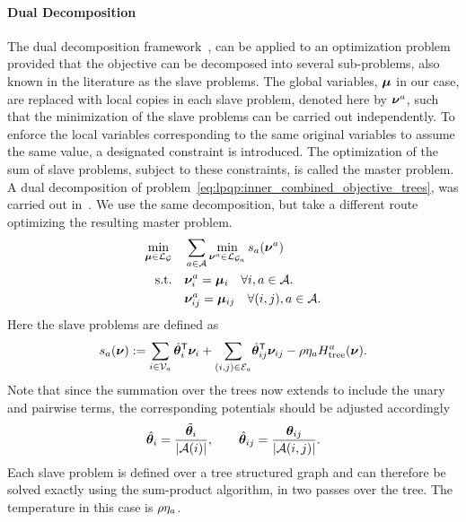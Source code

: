 \paragraph{Dual Decomposition}
The dual decomposition framework~\parencite{Bertsekas1999, Komodakis2007}, 
can be applied to an optimization problem provided that the objective 
can be decomposed into several sub-problems, also known in the literature 
as the slave problems. The global variables, $\bm{\mu}$ in our case, 
are replaced with local copies in each slave problem, denoted here by
$\bm{\nu}^a$, 
such that the minimization of the slave problems can be carried out 
independently. To enforce the local variables corresponding to the same 
original variables to assume the same value, a designated constraint is 
introduced. The optimization of the sum of slave problems, subject to 
these constraints, is called the master problem. 
A dual decomposition of problem~\eqref{eq:lpqp:inner_combined_objective_trees}, 
was carried out in~\parencite{Domke2011}. 
We use the same decomposition, but take a different route optimizing 
the resulting master problem. 
\begin{align}
    \label{eq:lpqp:inner_combined_objective_trees_dd}
    \min_{\bm{\mu}\in\mathcal{L}_{\mathcal{G}}} \quad &
    \sum_{a \in \mathcal{A}}
    \min_{\bm{\nu}^{a}\in\mathcal{L}_{\mathcal{G}_a}}
    s_{a}(\bm{\nu}^{a})\\
    \text{s.t.} \quad &   \bm{\nu}_i^{a} = \bm{\mu}_i \quad \forall i,a
    \in \mathcal{A}. \notag \\
    &   \bm{\nu}_{ij}^{a} = \bm{\mu}_{ij} \quad \forall (i,j), a
    \in \mathcal{A}. \notag
\end{align}
Here the slave problems are defined as
\[
s_{a}(\bm{\nu}) := \sum_{i\in \mathcal{V}_a}
{{\hat{\bm{\theta}}_i}}^{\mathsf{T}}  \bm{\nu}_{i}
    + \sum_{(i,j) \in \mathcal{E}_a} \!
    {{\hat{\bm{\theta}}_{ij}}}^{\mathsf{T}} \bm{\nu}_{ij}
    - \rho \eta_{a} H_{\text{tree}}^{a} (\bm{\nu}).
\]
Note that since the summation over the trees now extends to include the unary 
and pairwise terms, the corresponding potentials should be adjusted accordingly
\[
    {\hat{\bm{\theta}}_i} = \frac{\tilde{\bm{\theta}}_{i}}{|\mathcal{A}(i)|}, \qquad
     {\hat{\bm{\theta}}_{ij}} = \frac{\bm{\theta}_{ij}}{|\mathcal{A}(i,j)|}.
\]
Each slave problem is defined over a tree structured graph and can therefore
be solved exactly using the sum-product algorithm, in two passes over the tree. 
The temperature in this case is $\rho\eta_{a}$.

